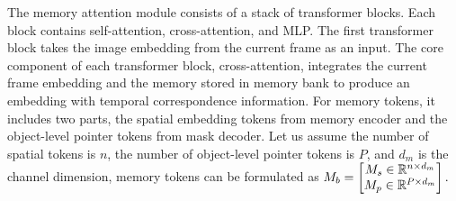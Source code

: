 The memory attention module consists of a stack of transformer blocks. Each block contains self-attention, cross-attention, and MLP. The first transformer block takes the image embedding from the current frame as an input. The core component of each transformer block, cross-attention, integrates the current frame embedding and the memory stored in memory bank to produce an embedding with temporal correspondence information. 
For memory tokens, it includes two parts, the spatial embedding tokens from memory encoder and the object-level pointer tokens from mask decoder. 
Let us assume the number of spatial tokens is $n$, the number of object-level pointer tokens is $P$, and $d_m$ is the channel dimension, memory tokens can be formulated as $
M_{b} = \begin{bmatrix} 
    M_s\in \mathbb{R}^{n\times d_m}\\
    M_p\in \mathbb{R}^{P\times d_m}
    \end{bmatrix}.
$

